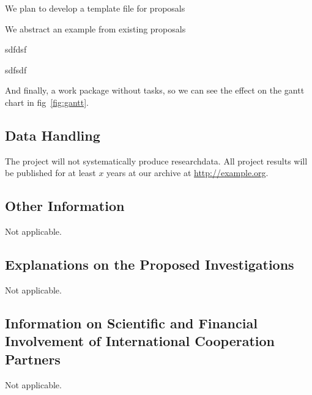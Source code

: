 \begin{workplan}
\begin{workarea}[id=systems,title={System Development}]
\begin{workpackage}[id=temple,lead=pcg,
  title= Proposal Template,short=Template,jacuRM=12]

We plan to develop a template file for {\pn} proposals

We abstract an example from existing proposals
\begin{tasklist}
  \begin{task}[wphases=6-12]
    sdfdsf 
  \end{task}
  \begin{task}[id=temple2,wphases=18-24,requires=\taskin{t3}{class}]
    sdfsdf
  \end{task} 
\end{tasklist}
\end{workpackage}

\begin{workpackage}[id=workphase,title=A work package without tasks,
  wphases=0-4!.5]
  
  And finally, a work package without tasks, so we can see the effect on the gantt chart
  in fig~\ref{fig:gantt}.
\end{workpackage}
\end{workarea}
\end{workplan} 

\ganttchart[draft,xscale=.45] 

\subsection{Data Handling}\label{sec:data}

The \pn project will not systematically produce researchdata. All project results will be
published for at least $x$ years at our archive at \url{http://example.org}.

\subsection{Other Information} Not applicable.

\subsection{Explanations on the Proposed Investigations} Not applicable.

\subsection{Information on Scientific and Financial Involvement of International Cooperation Partners} Not applicable.



